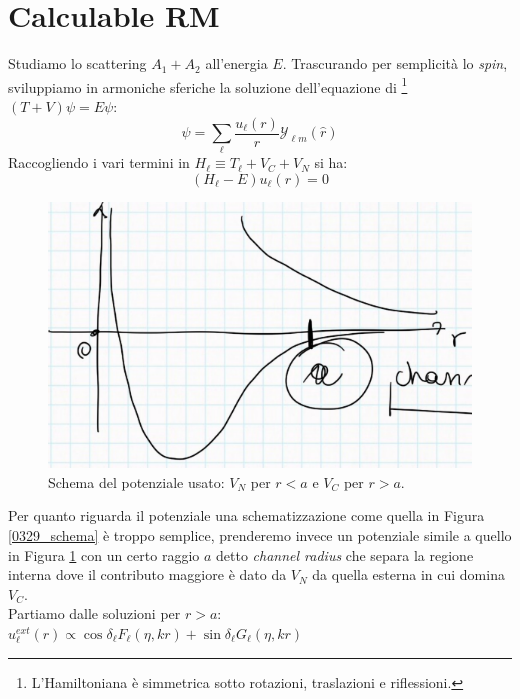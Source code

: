 \section{Calculable RM}\label{sec-RM-C}
Studiamo lo scattering $A_1 + A_2$ all'energia $E$. Trascurando per semplicità lo \textit{spin}, sviluppiamo in armoniche sferiche la soluzione dell'equazione di \Sch{}\footnote{L'Hamiltoniana è simmetrica sotto rotazioni, traslazioni e riflessioni.} $(T+V)\psi = E\psi$:
$$\psi = \sum_\ell \frac{u_\ell (r)}{r}\mathcal{Y}_{\ell m}(\hat{r})$$
Raccogliendo i vari termini in $H_\ell\equiv T_\ell + V_C + V_N$ si ha:
\begin{equation}\label{0412_sch}
	(H_\ell - E) u_\ell (r) =0
\end{equation}
\begin{figure}[h]
	\centering
	\includegraphics[scale=0.5]{Immagini/0412_potschem.png}
	\caption{Schema del potenziale usato: $V_N$ per $r<a$ e $V_C$ per $r>a$.}
	\label{0412_pot}
\end{figure}
\noindent Per quanto riguarda il potenziale una schematizzazione come quella in Figura \ref{0329_schema} è troppo semplice, prenderemo invece un potenziale simile a quello in Figura \ref{0412_pot} con un certo raggio $a$ detto \textit{channel radius} che separa la regione interna dove il contributo maggiore è dato da $V_N$ da quella esterna in cui domina $V_C$.\\ 
Partiamo dalle soluzioni per $r>a$:
$u_\ell^{ext} (r) \propto \cos{\delta_\ell} F_\ell (\eta, kr) + \sin{\delta_\ell}G_\ell (\eta,kr)$
